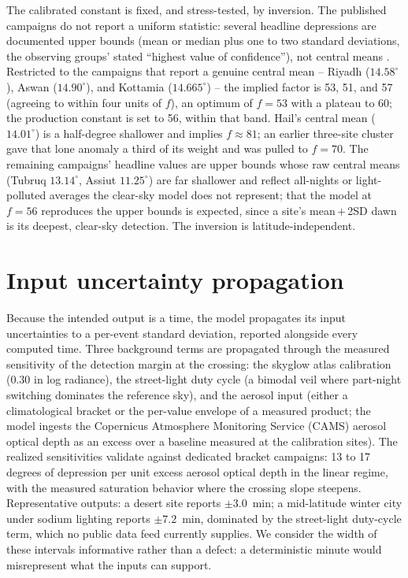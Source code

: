 \documentclass[preprint,12pt]{elsarticle}
\begin{document}
The calibrated constant is fixed, and stress-tested, by inversion. The
published campaigns do not report a uniform statistic: several headline
depressions are documented upper bounds (mean or median plus one to two
standard deviations, the observing groups' stated ``highest value of
confidence''), not central means \citep{hassan2014,hassan2016}.
Restricted to the campaigns that report a genuine central mean --
Riyadh ($14.58^\circ$), Aswan ($14.90^\circ$), and Kottamia
($14.665^\circ$) -- the implied factor is 53, 51, and 57 (agreeing to
within four units of $f$), an optimum of $f=53$ with a plateau to 60; the production
constant is set to 56, within that band. Hail's central mean
($14.01^\circ$) is a half-degree shallower and implies $f\approx81$; an
earlier three-site cluster gave that lone anomaly a third of its weight
and was pulled to $f=70$. The remaining campaigns' headline values are
upper bounds whose raw central means (Tubruq $13.14^\circ$, Assiut
$11.25^\circ$) are far shallower and reflect all-nights or light-polluted
averages the clear-sky model does not represent; that the model at
$f=56$ reproduces the upper bounds is expected, since a site's
mean\,$+$\,2SD dawn is its deepest, clear-sky detection. The inversion
is latitude-independent.

\section{Input uncertainty propagation}
\label{sec:uncertainty}

Because the intended output is a time, the model propagates its input
uncertainties to a per-event standard deviation, reported alongside every
computed time. Three background terms are propagated through the measured
sensitivity of the detection margin at the crossing: the skyglow atlas
calibration (0.30 in log radiance), the street-light duty cycle (a bimodal
veil where part-night switching dominates the reference sky), and the
aerosol input (either a climatological bracket or the per-value envelope
of a measured product; the model ingests the Copernicus Atmosphere
Monitoring Service (CAMS) aerosol optical depth as an excess over a
baseline measured at the calibration sites). The realized
sensitivities validate against dedicated bracket campaigns: 13 to 17
degrees of depression per unit excess aerosol optical depth in the linear
regime, with the measured saturation behavior where the crossing slope
steepens. Representative outputs: a desert site reports $\pm 3.0$~min; a
mid-latitude winter city under sodium lighting reports $\pm 7.2$~min,
dominated by the street-light duty-cycle term, which no public data feed
currently supplies. We consider the width of these intervals
informative rather than a defect: a deterministic minute would
misrepresent what the inputs can support.
\end{document}
